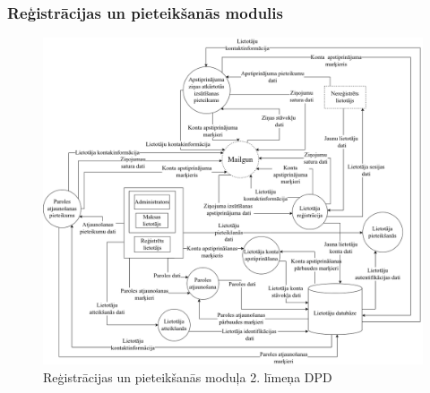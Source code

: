 \subsubsection{Reģistrācijas un pieteikšanās modulis}

\begin{figure}[htbp]
	\centering
	\includegraphics[width=\linewidth]{./src/img/ReģistrācijasPieteikšanāsModulis.png}
	\caption{Reģistrācijas un pieteikšanās moduļa 2. līmeņa DPD}
	\label{fig:dpd-2-auth}
\end{figure}








